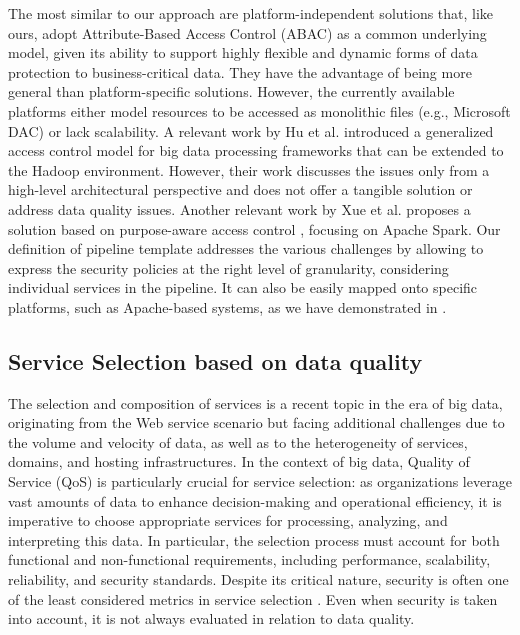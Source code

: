 The most similar to our approach are platform-independent solutions that, like ours, adopt Attribute-Based Access Control (ABAC) \cite{XACML3.0} as a common underlying model, given its ability to support highly flexible and dynamic forms of data protection to business-critical data. They have the advantage of being more general than platform-specific solutions. However, the currently available platforms either model resources to be accessed as monolithic files (e.g., Microsoft DAC) or lack scalability. A relevant work by Hu et al.  \cite{ HUFerraiolo:2014} introduced a generalized access control model for big data processing frameworks that can be extended to the Hadoop environment. However, their work discusses the issues only from a high-level architectural perspective and does not offer a tangible solution or address data quality issues. Another relevant work by Xue et al.  \cite{GuardSpark:ACSAC:2020} proposes a solution based on purpose-aware access control \cite{Byun2008}, focusing on Apache Spark.
%
Our definition of pipeline template addresses the various challenges by allowing to express the security policies at the right level of granularity, considering individual services in the pipeline. It can also be easily mapped onto specific platforms, such as Apache-based systems, as we have demonstrated in \cite{medes2021}.

\subsection{Service Selection based on data quality}\label{sec:servicesel}

The selection and composition of services is a recent topic in the era of big data, originating from the Web service scenario but facing additional challenges due to the volume and velocity of data, as well as to the heterogeneity of services, domains, and hosting infrastructures. In the context of big data, Quality of Service (QoS) is particularly crucial for service selection: as organizations leverage vast amounts of data to enhance decision-making and operational efficiency, it is imperative to choose appropriate services for processing, analyzing, and interpreting this data. In particular, the selection process must account for both functional and non-functional requirements, including performance, scalability, reliability, and security standards. Despite its critical nature, security is often one of the least considered metrics in service selection \cite{SELLAMI2020102732}. Even when security is taken into account, it is not always evaluated in relation to data quality.

